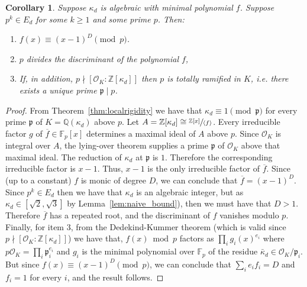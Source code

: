 \documentclass{article}
\theoremstyle{plain}
\newtheorem{theorem}{Theorem}[section]
\newtheorem{corollary}[theorem]{Corollary}
\theoremstyle{definition}
\theoremstyle{remark}
\newcommand{\Z}{\mathbb{Z}}
\newcommand{\Q}{\mathbb{Q}}
\newcommand{\F}{\mathbb{F}}
\begin{document}

\begin{corollary}\label{cor:modprigid}
Suppose $\kappa_d$ is algebraic with minimal polynomial $f$. Suppose $p^k\in E_d$ for some $k\ge1$ and some prime $p$. Then:
\begin{enumerate}
    \item $f(x)\equiv(x-1)^D \pmod p$.
    \item $p$ divides the discriminant of the polynomial $f$,
    \item If, in addition,  $p\nmid[\mathcal O_K:\Z[\kappa_d]]$ then $p$ is totally ramified in $K$, i.e. there exists a unique prime $\mathfrak{p} \mid p$. 
\end{enumerate}
\end{corollary}
\begin{proof}
From Theorem~\ref{thm:localrigidity} we have that  $\kappa_d\equiv1\pmod{\mathfrak p}$ for every prime $\mathfrak p$ of $K=\Q(\kappa_d)$ above $p$.
Let $A=\Z[\kappa_d]\cong\sfrac{\Z[x]}{\langle f\rangle}$.  Every irreducible factor $g$ of $\overline f\in\F_p[x]$ determines a maximal ideal of $A$ above $p$. Since $\mathcal{O}_K$ is integral over $A$, the lying-over theorem supplies a prime $\mathfrak p$ of $\mathcal{O}_K$ above that maximal ideal. The reduction of $\kappa_d$ at $\mathfrak p$ is $1$. Therefore the corresponding irreducible factor is $x-1$. Thus, $x-1$ is the only irreducible factor of $\overline f$. Since (up to a constant) $f$ is monic of degree $D$, we can conclude that $\overline f=(x-1)^D$. Since $p^k \in E_d$ then we have that $\kappa_d$ is an algebraic integer, but as   $\kappa_d \in [\sqrt{2}, \sqrt{3}]$ by Lemma~\ref{lem:naive_bound}), then we must have that $D>1$. Therefore $\overline f$ has a repeated root, and the discriminant of $f$ vanishes modulo $p$. Finally, for item 3, from the Dedekind-Kummer theorem (which is valid since $p\nmid[\mathcal O_K:\Z[\kappa_d]]$) we have that, $f(x)\bmod p$ factors as $\prod_ig_i(x)^{e_i}$ where $p\mathcal O_K=\prod_i\mathfrak p_i^{e_i}$ and $g_i$ is the minimal polynomial over $\F_p$ of the residue $\bar\kappa_d\in\mathcal O_K/\mathfrak p_i$. But since $f(x)\equiv (x-1)^D\pmod p$, we can conclude that  $\sum_ie_if_i=D$ and $f_i=1$ for every $i$, and the result follows.
\end{proof}
\end{document}

